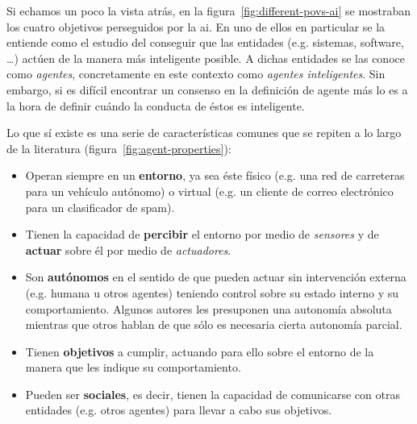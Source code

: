 Si echamos un poco la vista atrás, en la figura~\ref{fig:different-povs-ai} se mostraban los cuatro objetivos perseguidos por la \ac{ai}. En uno de ellos en particular se la entiende como el estudio del conseguir que las entidades (e.g. sistemas, software, \ldots) actúen de la manera más inteligente posible. A dichas entidades se las conoce como \textit{agentes}, concretamente en este contexto como \textit{agentes inteligentes}. Sin embargo, si es difícil encontrar un consenso en la definición de agente más lo es a la hora de definir cuándo la conducta de éstos es inteligente.

Lo que sí existe es una serie de características comunes que se repiten a lo largo de la literatura (figura~\ref{fig:agent-properties}):

\begin{itemize}
	\item Operan siempre en un \textbf{entorno}, ya sea éste físico (e.g. una red de carreteras para un vehículo autónomo) o virtual (e.g. un cliente de correo electrónico para un clasificador de spam).
	\item Tienen la capacidad de \textbf{percibir} el entorno por medio de \textit{sensores} y de \textbf{actuar} sobre él por medio de \textit{actuadores}.
	\item Son \textbf{autónomos} en el sentido de que pueden actuar sin intervención externa (e.g. humana u otros agentes) teniendo control sobre su estado interno y su comportamiento. Algunos autores les presuponen una autonomía absoluta mientras que otros hablan de que sólo es necesaria cierta autonomía parcial.
	\item Tienen \textbf{objetivos} a cumplir, actuando para ello sobre el entorno de la manera que les indique su comportamiento.
	\item Pueden ser \textbf{sociales}, es decir, tienen la capacidad de comunicarse con otras entidades (e.g. otros agentes) para llevar a cabo sus objetivos.
\end{itemize}


